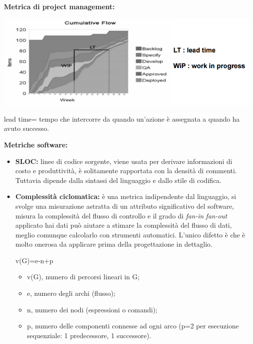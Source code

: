 \textbf{Metrica di project management:}

\includegraphics[width=0.5\columnwidth]{img1} %

lead time= tempo che intercorre da quando un'azione è assegnata a quando ha avuto successo.

\textbf{Metriche software:}
\begin{itemize}
	\item \textbf{SLOC:} linee di codice sorgente, viene usata per derivare informazioni di costo e produttività, è solitamente rapportata con la densità di commenti. Tuttavia dipende dalla sintassi del linguaggio e dallo stile di codifica.
	\item \textbf{Complessità ciclomatica:} è  una metrica indipendente dal linguaggio, si svolge una misurazione astratta di un attributo significativo del software, misura la complessità del flusso di controllo e il grado di \textit{fan-in} \textit{fan-out} applicato hai dati può aiutare a stimare la complessità del flusso di dati, meglio comunque calcolarlo con strumenti automatici. L'unico difetto è che è molto onerosa da applicare prima della progettazione in dettaglio.\\
	\begin{center}
		v(G)=e-n+p
	\end{center}
	\begin{itemize}
		\item v(G), numero di percorsi lineari in G;
		\item e, numero degli archi (flusso);
		\item n, numero dei nodi (espressioni o comandi);
		\item p, numero delle componenti connesse ad ogni arco (p=2 per esecuzione sequenziale: 1 predecessore, 1 successore).
	\end{itemize}		
	
\end{itemize}

